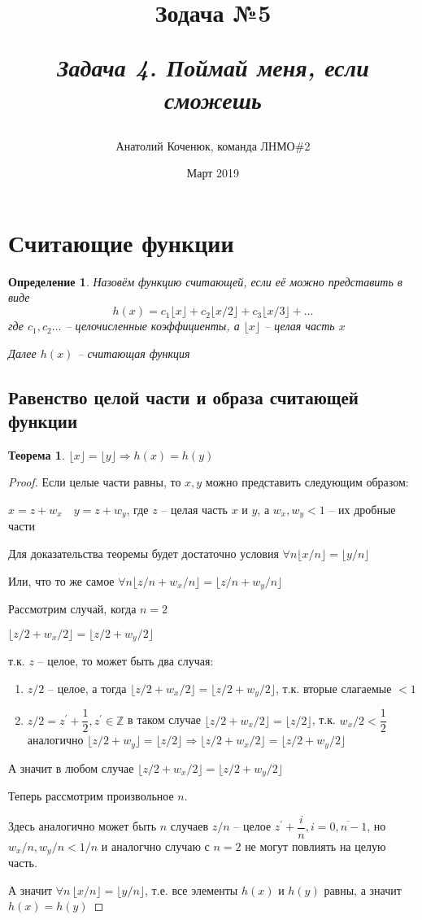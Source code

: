\documentclass[12pt,a4paper, flushleft]{article}
\author{Анатолий Коченюк, команда ЛНМО\#2}
\date{Март 2019}
\title{Зодача \textsuperscript{\textregistered} №5}
\title{
	\vspace{4cm}	
	\horline{380}	
	\begin{center}
		\begin{Huge}
			\textbf{\emph{Задача 4. Поймай меня, если сможешь}}
		\end{Huge}
	\end{center}	
	\vspace{-1.3cm}	
	\horline{400}
}
\newtheorem{Def}{Определение}[section]
\newtheorem{Th}{Теорема}[section]
\newcommand{\p}[1]{#1^{\prime}}
\newcommand{\fl}[1]{\lfloor #1 \rfloor}
\begin{document}
\maketitle
\pagebreak
\section{Считающие функции}

\begin{Def}
	Назовём функцию считающей, если её можно представить в виде $$h(x) = c_1\fl x + c_2 \fl{x/2} + c_3 \fl{x/3} + \dots$$
	где $c_1, c_2\dots$ -- целочисленные коэффициенты, а $\fl x$ -- целая часть $x$
	
	Далее $h(x)$ -- считающая функция
\end{Def}

\subsection{Равенство целой части и образа считающей функции}
\begin{Th}
	$\fl x = \fl y \Rightarrow h(x) = h(y)$
\end{Th}
\begin{proof}
	Если целые части равны, то $x, y$ можно представить следующим образом:
	
	$x = z + w_x\quad y = z + w_y$, где $z$ -- целая часть $x$ и $y$, а $w_x, w_y<1$ -- их дробные части 
	
	Для доказательства теоремы будет достаточно условия $\forall n \fl{x/n} = \fl{y/n}$
	
	Или, что то же самое $\forall n \fl{z/n + w_x/n} = \fl{z/n + w_y/n}$
	
	Рассмотрим случай, когда $n = 2$
	
	$\fl{z/2 + w_x/2} = \fl{z/2 + w_y/2}$
	
	т.к. $z$ -- целое, то может быть два случая:
	\begin{enumerate}
		\item $z/2$ -- целое, а тогда $\fl{z/2 + w_x/2} = \fl{z/2 + w_y/2}$, т.к. вторые слагаемые $<1$
		\item $z/2 = \p z + \dfrac{1}{2}, \p z\in\mathds{Z}$ в таком случае $\fl{z/2 + w_x/2} = \fl{z/2}$, т.к. $w_x/2<\dfrac{1}{2}$ аналогично $\fl{z/2 + w_y} = \fl{z/2}\Rightarrow \fl{z/2 + w_x/2} = \fl{z/2 + w_y/2}$
	\end{enumerate}
	
	А значит в любом случае $\fl{z/2 + w_x/2} = \fl{z/2 + w_y/2}$
	
	Теперь рассмотрим произвольное $n$.
	
	Здесь аналогично может быть $n$ случаев $z/n$ -- целое $\p z +  \dfrac{i}{n}, i = \overline{0, n-1}$, но $w_x/n, w_y/n <1/n$ и аналогчно случаю с $n=2$ не могут повлиять на целую часть.
	
	А значит $\forall n\, \fl{x/n} = \fl{y/n}$, т.е. все элементы $h(x)$ и $h(y)$ равны, а значит $h(x) = h(y)$
\end{proof}
\end{document}
